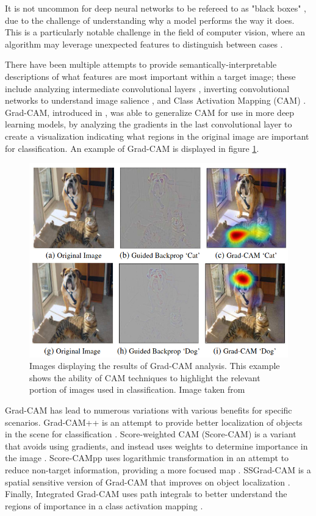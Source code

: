 It is not uncommon for deep neural networks to be refereed to as "black boxes" \citep{dabkowski2017real,fong2017interpretable,petsiuk2018rise,chattopadhay2018grad,naidu2020cam}, due to the challenge of understanding why a model performs the way it does.  This is a particularly notable challenge in the field of computer vision, where an algorithm may leverage unexpected features to distinguish between cases \citep{wei2018deep}. 
\par
There have been multiple attempts to provide semantically-interpretable descriptions of what features are most important within a target image; these include analyzing intermediate convolutional layers \citep{zeiler2014visualizing}, inverting convolutional networks to understand image salience \citep{mahendran2015understanding,dosovitskiy2016inverting}, and Class Activation Mapping (CAM) \citep{zhou2016learning}.  Grad-CAM, introduced in \citep{selvaraju2017grad}, was able to generalize CAM for use in more deep learning models, by analyzing the gradients in the last convolutional layer to create a visualization indicating what regions in the original image are important for classification.  An example of Grad-CAM is displayed in figure \ref{fig:gradcam_introduced}.

\begin{figure}
    \centering
    \includegraphics[width=0.5\linewidth]{Figures/gradcam_example.png}
    \caption{Images displaying the results of Grad-CAM analysis.  This example shows the ability of CAM techniques to highlight the relevant portion of images used in classification.  Image taken from \citep{selvaraju2017grad}}
    \label{fig:gradcam_introduced}
\end{figure}

Grad-CAM has lead to numerous variations with various benefits for specific scenarios.  Grad-CAM++ is an attempt to provide better localization of objects in the scene for classification \citep{chattopadhay2018grad}.  Score-weighted CAM (Score-CAM) is a variant that avoids using gradients, and instead uses weights to determine importance in the image \citep{wang2020score}.  Score-CAMpp uses logarithmic transformation in an attempt to reduce non-target information, providing a more focused map \citep{shi2022score}.  SSGrad-CAM is a spatial sensitive version of Grad-CAM that improves on object localization \citep{yamauchi2022spatial}.  Finally, Integrated Grad-CAM uses path integrals to better understand the regions of importance in a class activation mapping \citep{sattarzadeh2021integrated}.

